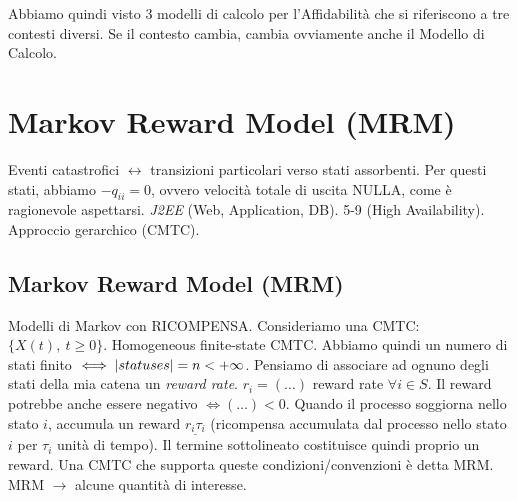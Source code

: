 \begin{center}
\end{center} 

Abbiamo quindi visto 3 modelli di calcolo per l'Affidabilità che si riferiscono a tre contesti diversi. Se il contesto cambia, cambia ovviamente anche il Modello di Calcolo.

\section{Markov Reward Model (MRM)}

Eventi catastrofici $\leftrightarrow$ transizioni particolari verso stati assorbenti. Per questi stati, abbiamo $-q_{ii}=0$, ovvero velocità totale di uscita NULLA, come è ragionevole aspettarsi. \textit{J2EE} (Web, Application, DB). 5-9 (High Availability). Approccio gerarchico (CMTC).

\subsection{Markov Reward Model (MRM)}

Modelli di Markov con RICOMPENSA. Consideriamo una CMTC: $\{X(t),\ t\geq 0\}$. Homogeneous finite-state CMTC. Abbiamo quindi un numero di stati finito $\iff \left\vert{statuses}\right\vert = n <+\infty$. Pensiamo di associare ad ognuno degli stati della mia catena un \textit{reward rate}. $r_i = (\dots)$ reward rate $\forall i\in S$. Il reward potrebbe anche essere negativo $\iff (\dots)<0$. Quando il processo soggiorna nello stato $i$, accumula un reward $\underline{r_i\tau_i}$ (ricompensa accumulata dal processo nello stato $i$ per $\tau_i$ unità di tempo). Il termine sottolineato costituisce quindi proprio un reward. Una CMTC che supporta queste condizioni/convenzioni è detta MRM. MRM $\rightarrow$ alcune quantità di interesse.

